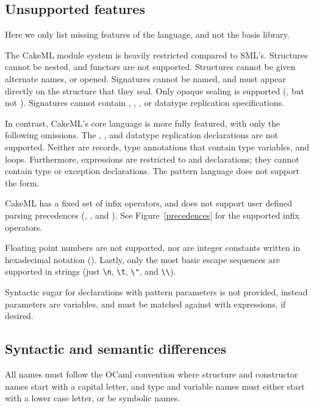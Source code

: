 \documentclass[12pt,a4paper]{book}
\begin{document}
\subsection{Unsupported features}
Here we only list missing features of the language, and not the basis library.

The CakeML module system is heavily restricted compared to SML's. Structures cannot be nested, and functors are not supported. Structures cannot be given alternate names, or opened. Signatures cannot be named, and must appear directly on the structure that they seal. Only opaque sealing is supported (\smlinline{:>}, but not \smlinline{:}). Signatures cannot contain , , ,  or datatype replication specifications.

In contrast, CakeML's core language is more fully featured, with only the following omissions. The , , and datatype replication declarations are not supported. Neither are records, type annotations that contain type variables, and  loops. Furthermore,  expressions are restricted to  and  declarations; they cannot contain type or exception declarations. The pattern language does not support the  form.

CakeML has a fixed set of infix operators, and does not support user defined parsing precedences (, , and ). See Figure~\ref{precedences} for the supported infix operators.

Floating point numbers are not supported, nor are integer constants written in hexadecimal notation (). Lastly, only the most basic escape sequences are supported in strings (just \texttt{\textbackslash n}, \texttt{\textbackslash t}, \texttt{\textbackslash "}, and \texttt{\textbackslash\textbackslash}).

Syntactic sugar for  declarations with pattern parameters is not provided, instead parameters are variables, and must be matched against with  expressions, if desired.

\subsection{Syntactic and semantic differences}

All names must follow the OCaml convention where structure and constructor names start with a capital letter, and type and variable names must either start with a lower case letter, or be symbolic names.
\end{document}
